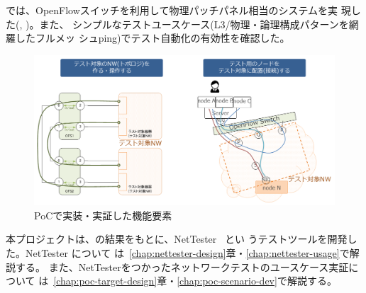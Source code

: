 \lopj では、OpenFlowスイッチを利用して物理パッチパネル相当のシステムを実
現した(, )。また、
シンプルなテストユースケース(L3/物理・論理構成パターンを網羅したフルメッ
シュping)でテスト自動化の有効性を確認した。

\begin{figure}[h]
 \centering \includegraphics[scale=0.5]{img/poc-l1patchpj.png}
 \caption{\lopj PoCで実装・実証した機能要素} \label{fig:poc-l1patchpj}
\end{figure}



 本プロジェクトは、\lopj の結果をもとに、NetTester~\cite{nettester} とい
 うテストツールを開発した。NetTester について
 は~\ref{chap:nettester-design}章・\ref{chap:nettester-usage}で解説する。
 また、NetTesterをつかったネットワークテストのユースケース実証について
 は~\ref{chap:poc-target-design}章・\ref{chap:poc-scenario-dev}で解説する。


